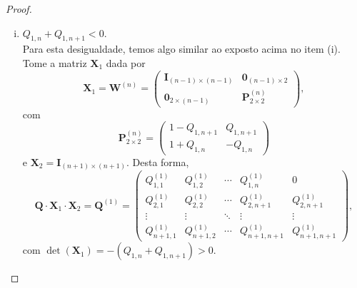 \documentclass[twoside,openright,titlepage,numbers=noenddot,headinclude,  lineheaders footinclude=true,cleardoublepage=empty,
                                BCOR=5mm,paper=a4,fontsize=12pt ]{scrbook}
\theoremstyle{definition}
\begin{document}
\begin{proof}
\begin{enumerate}[(i)]
\item  $Q_{1,n} + Q_{1, n+1} < 0$. \hfill \\
Para esta desigualdade, temos algo similar ao exposto
acima no  item (i).
Tome a matriz $\mathbf{X}_1$ dada por
\[
\mathbf{X}_1 = 
\mathbf{W}^{(n)} = 
\begin{pmatrix}
\mathbf{I}_{(n-1)\times (n-1)}& \mathbf{0}_{(n-1) \times 2} \\
\mathbf{0}_{2 \times (n-1)}   & \mathbf{P}^{(n)}_{2 \times 2}   
\end{pmatrix}
,
\]
com 
\[
\mathbf{P}^{(n)}_{2 \times 2}
=
\begin{pmatrix}
1 - Q_{1, n+1} & Q_{1, n+1} \\
1 + Q_{1,n}    & -Q_{1,n}
\end{pmatrix}
\]
e $\bm{X}_2 = \bm{I}_{(n+1) \times (n+1)}$.
Desta forma,
\[
\bm{Q} \cdot \bm{X}_1 \cdot \bm{X}_2 =
\mathbf{Q}^{(1)} = 
\begin{pmatrix}
Q^{(1)}_{1,1} & Q^{(1)}_{1,2} & \cdots & Q^{(1)}_{1,n} &0\\
Q^{(1)}_{2,1} & Q^{(1)}_{2,2} & \cdots & Q^{(1)}_{2,n+1}&
Q^{(1)}_{2,n+1}\\
\vdots & \vdots & \ddots & \vdots & \vdots \\
Q^{(1)}_{n+1,1} & Q^{(1)}_{n+1,2} & \cdots & Q^{(1)}_{n+1,n+1} &
Q^{(1)}_{n+1,n+1}
\end{pmatrix}
,
\]
com $\det(\mathbf{X}_1) = -( Q_{1,n} + Q_{1, n+1}) > 0$.


\end{enumerate}
\end{proof}
\end{document}
